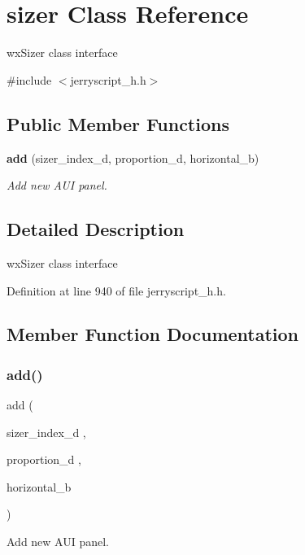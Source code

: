 \section{sizer Class Reference}
\label{classsizer}


wx\+Sizer class interface  




{\ttfamily \#include $<$jerryscript\+\_\+h.\+h$>$}

\subsection*{Public Member Functions}
\begin{DoxyCompactItemize}
\item 
\textbf{ add} (sizer\+\_\+index\+\_\+d, proportion\+\_\+d, horizontal\+\_\+b)
\begin{DoxyCompactList}\small\item\em Add new A\+UI panel. \end{DoxyCompactList}\end{DoxyCompactItemize}


\subsection{Detailed Description}
wx\+Sizer class interface 

Definition at line 940 of file jerryscript\+\_\+h.\+h.



\subsection{Member Function Documentation}
\mbox{\label{classsizer_a8575f2b33c9494f4869106594b5ad1c4}} 
\subsubsection{add()}
{\footnotesize\ttfamily add (\begin{DoxyParamCaption}\item[{sizer\+\_\+index\+\_\+d}]{,  }\item[{proportion\+\_\+d}]{,  }\item[{horizontal\+\_\+b}]{ }\end{DoxyParamCaption})}



Add new A\+UI panel. 


